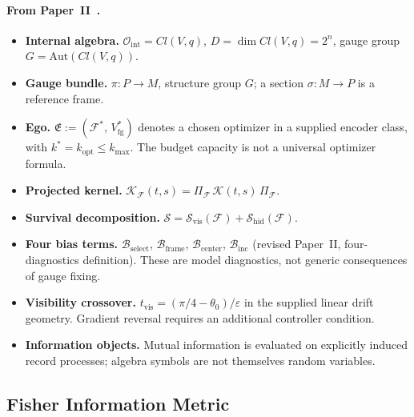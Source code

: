 \documentclass[12pt,a4paper,openany]{book}
\begin{document}
\paragraph{From Paper~II~\cite{Liu2026TDOME_II}.}
\begin{itemize}
\item \textbf{Internal algebra.}
  $\mathcal{O}_{\mathrm{int}} = Cl(V,q)$, $D = \dim Cl(V,q) = 2^n$,
  gauge group $G = \mathrm{Aut}(Cl(V,q))$.
\item \textbf{Gauge bundle.}
  $\pi: P \to M$, structure group $G$; a section
  $\sigma: M \to P$ is a reference frame.
\item \textbf{Ego.}
  $\mathfrak{E} := (\mathcal{F}^*,\,V_{\mathrm{fg}}^*)$
  denotes a chosen optimizer in a supplied encoder class, with
  $k^*=k_{\mathrm{opt}}\leq k_{\max}$.  The budget capacity is not a
  universal optimizer formula.
\item \textbf{Projected kernel.}
  $\mathcal{K}_{\mathcal{F}}(t,s)
  = \Pi_{\mathcal{F}}\,\mathcal{K}(t,s)\,
  \Pi_{\mathcal{F}}$.
\item \textbf{Survival decomposition.}
  $\mathcal{S} = \mathcal{S}_{\mathrm{vis}}(\mathcal{F})
  + \mathcal{S}_{\mathrm{hid}}(\mathcal{F})$.
\item \textbf{Four bias terms.}
  $\mathcal{B}_{\mathrm{select}}$,
  $\mathcal{B}_{\mathrm{frame}}$,
  $\mathcal{B}_{\mathrm{center}}$,
  $\mathcal{B}_{\mathrm{inc}}$
  (revised Paper~II, four-diagnostics definition).  These are model
  diagnostics, not generic consequences of gauge fixing.
\item \textbf{Visibility crossover.}
  $t_{\mathrm{vis}}=(\pi/4-\theta_0)/\varepsilon$ in the supplied
  linear drift geometry.  Gradient reversal requires an additional
  controller condition.
\item \textbf{Information objects.}
  Mutual information is evaluated on explicitly induced record
  processes; algebra symbols are not themselves random variables.
\end{itemize}

\subsection{Fisher Information Metric}
\label{T-III-subsec:fisher}
\end{document}
